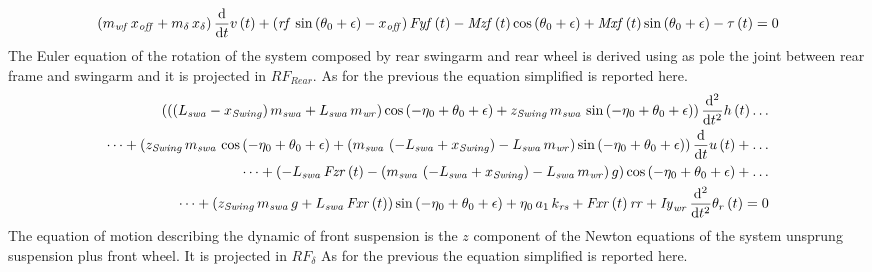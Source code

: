 %
%
\footnotesize
\begin{equation}
\left( m_{{\it wf}}\,x_{{\it off}}+m_{\delta}\,x_{\delta} \right) {\frac {\rm d}{{\rm d}t}}v \left( t \right) + \left( {\it rf}\,\sin \left( \theta_{0}+\epsilon \right) -x_{{\it off}} \right) {\it Fyf} \left( t \right) -{\it Mzf} \left( t \right) \cos \left( \theta_{0}+\epsilon \right) +{\it Mxf} \left( t \right) \sin \left( \theta_{0}+\epsilon \right) -\tau \left( t \right)  = 0 
\end{equation}
\normalsize
%
The Euler equation of the rotation of the system composed by rear swingarm and rear wheel is derived using as pole the joint between rear frame and swingarm and it is projected in $RF_{Rear}$.
As for the previous the equation simplified is reported here.
%
\footnotesize
\begin{equation}
\begin{split}
\left( \left(  \left( L_{{\it swa}}-x_{{\it Swing}} \right) m_{{\it swa}}+L_{{\it swa}}\,m_{{\it wr}} \right) \cos \left( -\eta_{0}+\theta_{0}+\epsilon \right) +z_{{\it Swing}}\,m_{{\it swa}}\,\sin \left( -\eta_{0}+\theta_{0}+\epsilon \right) \right) {\frac {{\rm d}^{2}}{{\rm d}{t}^{2}}}h \left( t \right) \dots \\
\dots + \left( z_{{\it Swing}}\,m_{{\it swa}}\,\cos\left( -\eta_{0}+\theta_{0}+\epsilon \right) + \left( m_{{\it swa}}\,\left( -L_{{\it swa}}+x_{{\it Swing}} \right) -L_{{\it swa}}\,m_{{\it wr}} \right) \sin \left( -\eta_{0}+\theta_{0}+\epsilon \right) \right) {\frac {\rm d}{{\rm d}t}}u \left( t \right) + \dots \\
\dots + \left( -L_{{\it swa}}\,{\it Fzr} \left( t \right) - \left( m_{{\it swa}}\, \left( -L_{{\it swa}}+x_{{\it Swing}} \right) -L_{{\it swa}}\,m_{{\it wr}} \right) g \right) \cos \left( -\eta_{0}+\theta_{0}+\epsilon \right) + \dots\\
\dots + \left( z_{{\it Swing}}\,m_{{\it swa}}\,g+L_{{\it swa}}\,{\it Fxr} \left( t \right)  \right) \sin \left( -\eta_{0}+\theta_{0}+\epsilon \right) +\eta_{0}\,a_{1}\,k_{{\it rs}}+{\it Fxr} \left( t \right) {\it rr} +{\it Iy}_{{\it wr}}\,{\frac {{\rm d}^{2}}{{\rm d}{t}^{2}}}\theta_{r} \left( t \right)  = 0
\end{split}   
\end{equation}
\normalsize
%
The equation of motion describing the dynamic of front suspension is the $z$ component of the Newton equations of the system unsprung suspension plus front wheel. It is projected in $RF_\delta$
As for the previous the equation simplified is reported here.
%
\footnotesize
